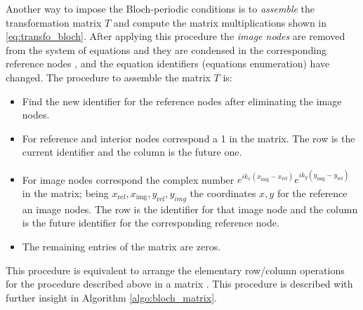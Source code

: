 Another way to impose the Bloch-periodic conditions is to \emph{assemble} the transformation matrix $T$ and compute the matrix multiplications shown in \eqref{eq:transfo_bloch}. After applying this procedure the \emph{image nodes} are removed from the system of equations and they are condensed in the corresponding reference nodes \cite{langlet-thesis, hladky-hennion1992}, and the equation identifiers (equations enumeration) have changed. The procedure to assemble the matrix $T$ is:
\begin{itemize}
\item Find the new identifier for the reference nodes after eliminating the image nodes.
\item For reference and interior nodes correspond a 1 in the matrix. The row is the current identifier and the column is the future one.
\item For image nodes correspond the complex number $e^{ik_x (x_\text{img}-x_\text{ref})}e^{ik_y (y_\text{img}-y_\text{ref})}$ in the matrix; being $x_\text{ref},x_\text{img},y_\text{ref},y_{img}$ the coordinates $x,y$ for the reference an image nodes. The row is the identifier for that image node and the column is the future identifier for the corresponding reference node.
\item The remaining entries of the matrix are zeros.
\end{itemize}
This procedure is equivalent to arrange the elementary row/column operations for the procedure described above in a matrix \cite{algebra_lineal-poole}. This procedure is described with further insight in Algorithm \ref{algo:bloch_matrix}.
